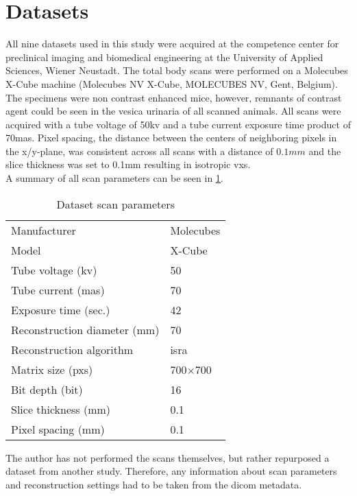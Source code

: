 \section{Datasets}\label{s:datasets}
All nine datasets used in this study were acquired at the competence center for preclinical imaging and biomedical engineering at the University of Applied Sciences, Wiener Neustadt.
The total body scans were performed on a Molecubes X-Cube \mct\space machine (Molecubes NV X-Cube, MOLECUBES NV, Gent, Belgium).
The specimens were non contrast enhanced mice, however, remnants of contrast agent could be seen in the vesica urinaria of all scanned animals.
All scans were acquired with a tube voltage of 50\acrshort{kv} and a tube current exposure time product of 70\acrshort{mas}.
Pixel spacing, the distance between the centers of neighboring pixels in the x/y-plane, was consistent across all scans with a distance of $0.1mm$ and the slice thickness was set to 0.1mm resulting in isotropic \glspl{vx}.\\
A summary of all scan parameters can be seen in \cref{tab:scan-parameters}.
\begin{table}
	\begin{center}
		\begin{tabular}{l l}
			Manufacturer                  & Molecubes      \\
			Model                         & X-Cube         \\
			Tube voltage (\acrshort{kv})  & 50             \\
			Tube current (\acrshort{mas}) & 70             \\
			Exposure time (sec.)          & 42             \\
			Reconstruction diameter (mm)  & 70             \\
			Reconstruction algorithm      & \gls{isra}     \\
			Matrix size (\glspl{px})      & 700$\times$700 \\
			Bit depth (\gls{bit})         & 16             \\
			Slice thickness (mm)          & 0.1            \\
			Pixel spacing (mm)            & 0.1            \\
		\end{tabular}
		\caption{Dataset scan parameters}\label{tab:scan-parameters}
	\end{center}
\end{table}
\noindent
The author has not performed the scans themselves, but rather repurposed a dataset from another study.
Therefore, any information about scan parameters and reconstruction settings had to be taken from the \gls{dicom} metadata.


